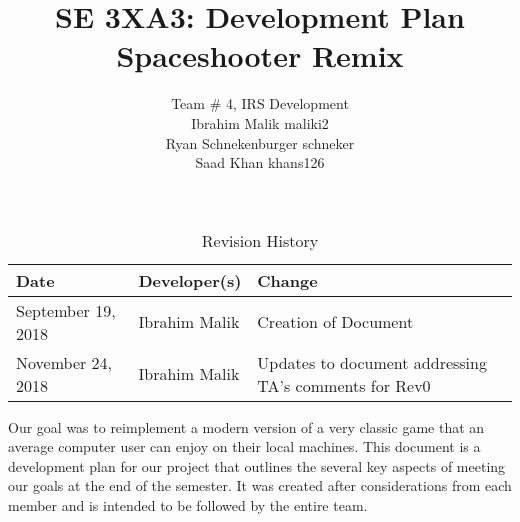 \documentclass{article}
\begin{document}
\title{SE 3XA3: Development Plan\\Spaceshooter Remix}

\author{Team \# 4, IRS Development 
		\\ Ibrahim Malik maliki2
		\\ Ryan Schnekenburger  schneker
		\\ Saad Khan khans126
}

\date{}

\maketitle

\newpage

\begin{table}[hp]
\caption{Revision History} \label{TblRevisionHistory}
\begin{tabularx}{\textwidth}{llX}
\toprule
\textbf{Date} & \textbf{Developer(s)} & \textbf{Change}\\
\midrule
September 19, 2018 & Ibrahim Malik & Creation of Document\\
November 24, 2018 & Ibrahim Malik & Updates to document addressing TA's comments for Rev0 \\
\bottomrule
\end{tabularx}
\end{table}

\newpage



Our goal was to reimplement a modern version of a very classic game that an average computer user can enjoy on their local machines. This document is a development plan for our project that outlines the several key aspects of meeting our goals at the end of the semester. It was created after considerations from each member and is intended to be followed by the entire team. 
\end{document}
